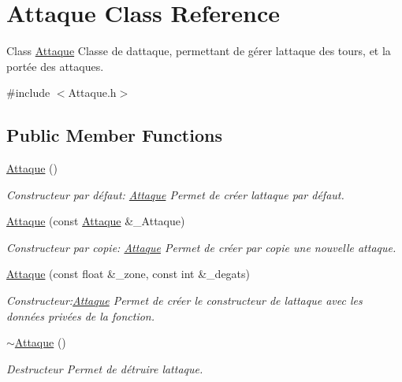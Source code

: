 \hypertarget{classAttaque}{}\section{Attaque Class Reference}
\label{classAttaque}


Class \hyperlink{classAttaque}{Attaque} Classe de d\textquotesingle{}attaque, permettant de gérer l\textquotesingle{}attaque des tours, et la portée des attaques.  




{\ttfamily \#include $<$Attaque.\+h$>$}

\subsection*{Public Member Functions}
\begin{DoxyCompactItemize}
\item 
\hyperlink{classAttaque_a1683db1342d1d26f9fc2162ef1975b23}{Attaque} ()
\begin{DoxyCompactList}\small\item\em Constructeur par défaut\+: \hyperlink{classAttaque}{Attaque} Permet de créer l\textquotesingle{}attaque par défaut. \end{DoxyCompactList}\item 
\hyperlink{classAttaque_a1a6b78c3649a5860530da68f9c6bbfbf}{Attaque} (const \hyperlink{classAttaque}{Attaque} \&\+\_\+\+Attaque)
\begin{DoxyCompactList}\small\item\em Constructeur par copie\+: \hyperlink{classAttaque}{Attaque} Permet de créer par copie une nouvelle attaque. \end{DoxyCompactList}\item 
\hyperlink{classAttaque_a103553de7b33d7f8682f9beaa51d878a}{Attaque} (const float \&\+\_\+zone, const int \&\+\_\+degats)
\begin{DoxyCompactList}\small\item\em Constructeur\+:\hyperlink{classAttaque}{Attaque} Permet de créer le constructeur de l\textquotesingle{}attaque avec les données privées de la fonction. \end{DoxyCompactList}\item 
\mbox{\label{classAttaque_a1053986fc93c91f74ea60c898e6fc289}} 
\hyperlink{classAttaque_a1053986fc93c91f74ea60c898e6fc289}{$\sim$\+Attaque} ()
\begin{DoxyCompactList}\small\item\em Destructeur Permet de détruire l\textquotesingle{}attaque. \end{DoxyCompactList}\item 

\end{DoxyCompactItemize}
